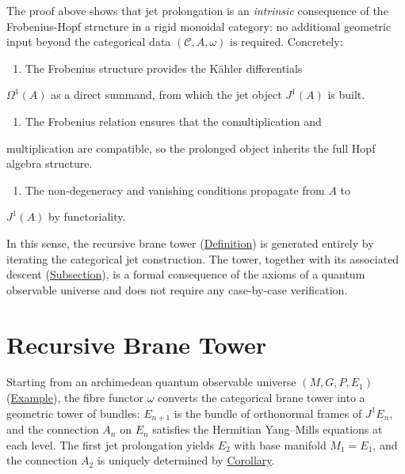 \begin{remark}
  \label{rem:prolongation-categorical}
The proof above shows that jet prolongation is an \emph{intrinsic}
consequence of the Frobenius-Hopf structure in a rigid monoidal category:
no additional geometric input beyond the categorical data
$(\mathcal{C}, A, \omega)$ is required.  Concretely:

\begin{enumerate}
  \item The Frobenius structure provides the Kähler differentials
\end{enumerate}
   $\Omega^1(A)$ as a direct summand, from which the jet object
   $J^1(A)$ is built.
\begin{enumerate}
  \item The Frobenius relation ensures that the comultiplication and
\end{enumerate}
   multiplication are compatible, so the prolonged object inherits
   the full Hopf algebra structure.
\begin{enumerate}
  \item The non-degeneracy and vanishing conditions propagate from $A$ to
\end{enumerate}
   $J^1(A)$ by functoriality.

In this sense, the recursive brane tower
(\hyperref[def:recursive-brane-tower]{Definition}) is generated entirely by
iterating the categorical jet construction.  The tower, together with its
associated descent (\hyperref[ssec:descent]{Subsection}), is a formal consequence
of the axioms of a quantum observable universe and does not require any
case-by-case verification.
\end{remark}

\section{Recursive Brane Tower}
\label{sec:recursive-brane-tower}

\begin{example}
  \label{ex:brane-tower-levels}
Starting from an archimedean quantum observable universe $(M, G, P, E_1)$
(\hyperref[def:c-quantum-observable-universe]{Example}), the fibre functor
$\omega$ converts the categorical brane tower into a geometric tower of
bundles: $E_{n+1}$ is the bundle of orthonormal frames of $J^1 E_n$, and
the connection $A_n$ on $E_n$ satisfies the Hermitian Yang--Mills equations
at each level.  The first jet prolongation yields $E_2$ with base manifold
$M_1 = E_1$, and the connection $A_2$ is uniquely determined by
\hyperref[cor:jet-prolongation-C]{Corollary}.
\end{example}

